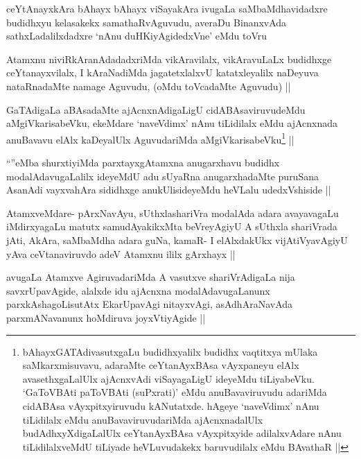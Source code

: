 \begin{artha}
ceYtAnayxkAra bAhayx bAhayx viSayakAra ivugaLa saMbaMdhavidadxre budidhxyu kelasakekx samathaRvAguvudu, averaDu BinanxvAda sathxLadalilxdadxre `nAnu duHKiyAgidedxVne' eMdu toVru
\end{artha}

\begin{artha}
Atamxnu niviRkAranAdadadxriMda vikAravilalx, vikAravuLaLx budidhxge ceYtanayxvilalx, I kAraNadiMda jagatetxlalxvU katatxleyalilx naDeyuva nataRnadaMte namage Aguvudu, (oMdu toVcadaMte Aguvudu) ||
\end{artha}

\begin{artha}
GaTAdigaLa aBAsadaMte ajAcnxnAdigaLigU cidABAsaviruvudeMdu aMgiVkarisabeVku, ekeMdare `naveVdimx' nAnu tiLidilalx eMdu ajAcnxnada anuBavavu elAlx kaDeyalUlx AguvudariMda aMgiVkarisabeVku\footnote{bAhayxGATAdivasutxgaLu budidhxyalilx budidhx vaqtitxya mUlaka saMkarxmisuvavu, adaraMte ceYtanAyxBAsa vAyxpaneyu elAlx avasethxgaLalUlx ajAcnxvAdi viSayagaLigU ideyeMdu tiLiyabeVku. `GaToVBAti paToVBAti (suPxrati)' eMdu anuBavaviruvudu adariMda cidABAsa vAyxpitxyiruvudu kANutatxde. hAgeye `naveVdimx' nAnu tiLidilalx eMdu anuBavaviruvudariMda ajAcnxnadalUlx budAdhxyXdigaLalUlx ceYtanAyxBAsa vAyxpitxyide adilalxvAdare nAnu tiLidilalxveMdU tiLiyade heVLuvudakekx baruvudilalx eMdu BAvathaR ||} ||
\end{artha}

\begin{artha}
``\stext''eMba shurxtiyiMda parxtayxgAtamxna anugarxhavu budidhx modalAdavugaLalilx ideyeMdU adu sUyaRna anugarxhadaMte puruSana AsanAdi vayxvahAra sididhxge anukUlisideyeMdu heVLalu udedxVshiside ||
\end{artha}

\begin{artha}
AtamxveMdare- pArxNavAyu, sUthxlashariVra modalAda adara avayavagaLu iMdirxyagaLu matutx samudAyakikxMta beVreyAgiyU A sUthxla shariVrada jAti, AkAra, saMbaMdha adara guNa, kamaR- I elAlxdakUkx vijAtiVyavAgiyU yAva ceVtanaviruvdo adeV Atamxnu ililx gArxhayx ||
\end{artha}

\begin{artha}
avugaLa Atamxve AgiruvadariMda A vasutxve shariVrAdigaLa nija savxrUpavAgide, alalxde idu ajAcnxna modalAdavugaLanunx parxkAshagoLisutAtx EkarUpavAgi nitayxvAgi, asAdhAraNavAda parxmANavanunx hoMdiruva  joyxVtiyAgide ||
\end{artha}

